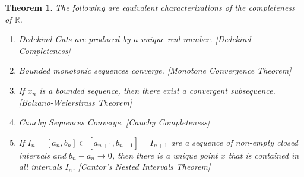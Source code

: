 \documentclass[oneside]{book}
\theoremstyle{mystyle}
\newtheorem{theorem}{Theorem}[section]
\begin{document}
\begin{theorem}
The following are equivalent characterizations of the completeness of $\mathbb{R}$.
\begin{enumerate}
\item Dedekind Cuts are produced by a unique real number. \hfill [Dedekind Completeness]
\item Bounded monotonic sequences converge. \hfill [Monotone Convergence Theorem]
\item If $x_n$ is a bounded sequence, then there exist a convergent subsequence. \hfill [Bolzano-Weierstrass Theorem]
\item Cauchy Sequences Converge. \hfill [Cauchy Completeness]
\item If $I_n = [a_n,b_n]\subset [a_{n+1},b_{n+1}]=I_{n+1}$ are a sequence of non-empty closed intervals and $b_n-a_n \rightarrow 0$, then there is a unique point $x$ that is contained in all intervals $I_n$. \hfill [Cantor's Nested Intervals Theorem]
\end{enumerate}
\end{theorem}
\end{document}
